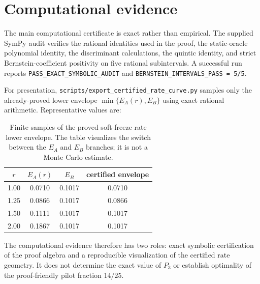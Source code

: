 \section{Computational evidence}\label{sec:computational-evidence}

The main computational certificate is exact rather than empirical.  The supplied SymPy audit verifies the rational identities used in the proof, the static-oracle polynomial identity, the discriminant calculations, the quintic identity, and strict Bernstein-coefficient positivity on five rational subintervals.  A successful run reports \texttt{PASS\_EXACT\_SYMBOLIC\_AUDIT} and \texttt{BERNSTEIN\_INTERVALS\_PASS = 5/5}.

For presentation, \texttt{scripts/export\_certified\_rate\_curve.py} samples only the already-proved lower envelope $\min\{E_A(r),E_B\}$ using exact rational arithmetic.  Representative values are:

\begin{table}[ht]
\centering
\begin{tabular}{c|ccc}
$r$ & $E_A(r)$ & $E_B$ & certified envelope \\
\hline
1.00 & 0.0710 & 0.1017 & 0.0710 \\
1.25 & 0.0866 & 0.1017 & 0.0866 \\
1.50 & 0.1111 & 0.1017 & 0.1017 \\
2.00 & 0.1867 & 0.1017 & 0.1017
\end{tabular}
\caption{Finite samples of the proved soft-freeze rate lower envelope.  The table visualizes the switch between the $E_A$ and $E_B$ branches; it is not a Monte Carlo estimate.}
\label{tab:soft-freeze-rate-curve}
\end{table}

The computational evidence therefore has two roles: exact symbolic certification of the proof algebra and a reproducible visualization of the certified rate geometry.  It does not determine the exact value of $P_3$ or establish optimality of the proof-friendly pilot fraction $14/25$.
